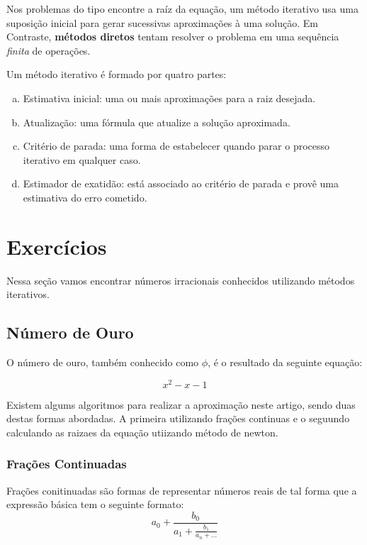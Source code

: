 \documentclass[a4paper]{article}
\begin{document}
Nos problemas do tipo encontre a raíz da equação, um método iterativo usa
uma suposição inicial para gerar sucessivas aproximações à uma solução. Em
Contraste, \textbf{métodos diretos} tentam resolver o problema em uma sequência
\emph{finita} de operações.

Um método iterativo é formado por quatro partes:~\cite{claudio2000calculo}
\begin{enumerate}[a)]
	\item Estimativa inicial: uma ou mais aproximações para a raiz desejada.
    \item Atualização: uma fórmula que atualize a solução aproximada.
    \item Critério de parada: uma forma de estabelecer quando parar o processo iterativo em qualquer caso.
    \item Estimador de exatidão: está associado ao critério de parada e provê uma estimativa do erro cometido.
\end{enumerate}

\newpage

\section{Exercícios}
Nessa seção vamos encontrar números irracionais conhecidos utilizando métodos iterativos.

\subsection{Número de Ouro}

	O número de ouro, também conhecido como $\phi$, é o resultado da seguinte
	equação:

	\begin{equation}
		x^2-x-1
	\end{equation}

	Existem algums algoritmos para realizar a aproximação neste artigo, sendo
	duas destas formas  abordadas. A primeira utilizando frações continuas e o
	seguundo calculando as raizaes da equação utiizando método de newton.

\subsubsection{Frações Continuadas}

	Frações conitinuadas são formas de representar números reais de tal forma
	que a expressão básica tem o seguinte formato:
	\begin{equation}\label{eq:phi}
		a_0 + \frac{b_0}{a_1 + \frac{b_1}{a_n + \dots}}
	\end{equation}
\end{document}
